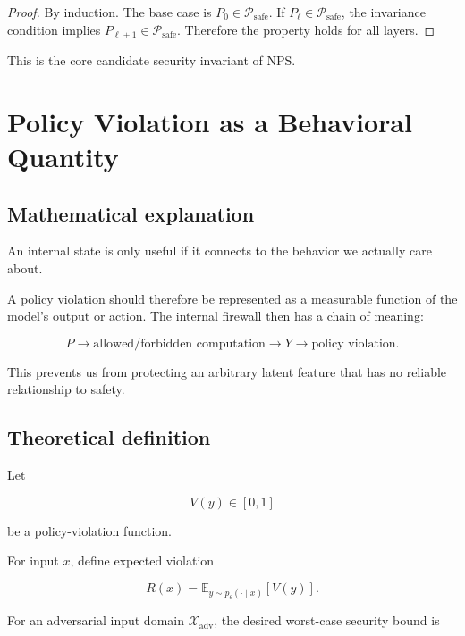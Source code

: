 \documentclass[11pt]{article}
\newcommand{\X}{\mathcal{X}}
\newcommand{\Psafe}{\mathcal{P}_{\mathrm{safe}}}
\newcommand{\E}{\mathbb{E}}
\begin{document}
\begin{proof}
By induction. The base case is $P_0\in\Psafe$. If $P_\ell\in\Psafe$, the
invariance condition implies $P_{\ell+1}\in\Psafe$. Therefore the property
holds for all layers.
\end{proof}

This is the core candidate security invariant of NPS.

\section{Policy Violation as a Behavioral Quantity}

\subsection*{Mathematical explanation}

An internal state is only useful if it connects to the behavior we actually
care about.

A policy violation should therefore be represented as a measurable function
of the model's output or action. The internal firewall then has a chain of
meaning:

\begin{equation}
P
\rightarrow
\text{allowed/forbidden computation}
\rightarrow
Y
\rightarrow
\text{policy violation}.
\end{equation}

This prevents us from protecting an arbitrary latent feature that has no
reliable relationship to safety.

\subsection*{Theoretical definition}

Let

\begin{equation}
V(y)\in[0,1]
\end{equation}

be a policy-violation function.

For input $x$, define expected violation

\begin{equation}
R(x)
=
\E_{y\sim p_\theta(\cdot\mid x)}
[V(y)].
\end{equation}

For an adversarial input domain $\X_{\mathrm{adv}}$, the desired worst-case
security bound is
\end{document}
